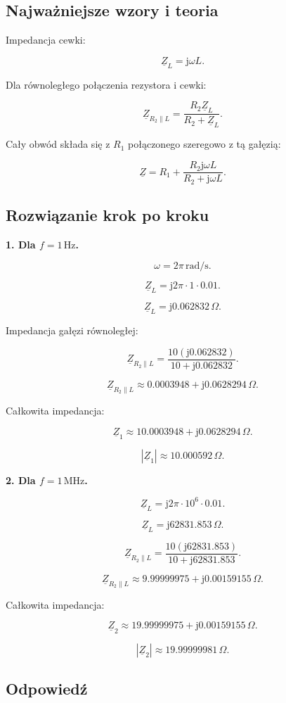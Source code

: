 \documentclass[12pt,a4paper]{article}
\newcommand{\jw}{\mathrm{j}\omega}
\newcommand{\Z}{\underline{Z}}
\begin{document}
\subsection*{Najważniejsze wzory i teoria}

Impedancja cewki:

\[
\Z_L=\jw L.
\]

Dla równoległego połączenia rezystora i cewki:

\[
\Z_{R_2\parallel L}
=
\frac{R_2\Z_L}{R_2+\Z_L}.
\]

Cały obwód składa się z $R_1$ połączonego szeregowo z tą gałęzią:

\[
\Z=R_1+\frac{R_2\jw L}{R_2+\jw L}.
\]

\subsection*{Rozwiązanie krok po kroku}

\textbf{1. Dla $f=1\,\mathrm{Hz}$.}

\[
\omega=2\pi\,\mathrm{rad/s}.
\]

\[
\Z_L=
\mathrm{j}2\pi\cdot1\cdot0.01.
\]

\[
\Z_L=\mathrm{j}0.062832\,\Omega.
\]

Impedancja gałęzi równoległej:

\[
\Z_{R_2\parallel L}
=
\frac{10(\mathrm{j}0.062832)}
{10+\mathrm{j}0.062832}.
\]

\[
\Z_{R_2\parallel L}
\approx
0.0003948+\mathrm{j}0.0628294\,\Omega.
\]

Całkowita impedancja:

\[
\Z_1
\approx
10.0003948+\mathrm{j}0.0628294\,\Omega.
\]

\[
|\Z_1|\approx10.000592\,\Omega.
\]

\textbf{2. Dla $f=1\,\mathrm{MHz}$.}

\[
\Z_L=
\mathrm{j}2\pi\cdot10^6\cdot0.01.
\]

\[
\Z_L=\mathrm{j}62831.853\,\Omega.
\]

\[
\Z_{R_2\parallel L}
=
\frac{10(\mathrm{j}62831.853)}
{10+\mathrm{j}62831.853}.
\]

\[
\Z_{R_2\parallel L}
\approx
9.99999975+\mathrm{j}0.00159155\,\Omega.
\]

Całkowita impedancja:

\[
\Z_2
\approx
19.99999975+\mathrm{j}0.00159155\,\Omega.
\]

\[
|\Z_2|\approx19.99999981\,\Omega.
\]

\subsection*{Odpowiedź}
\end{document}
